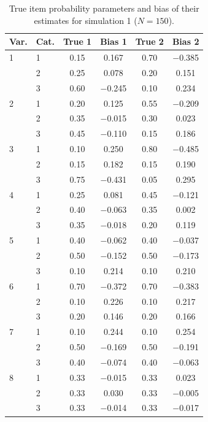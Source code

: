 \begin{table}[H]
\centering
\begin{tabular}{llcccc}
  \toprule
\textbf{Var.} & \textbf{Cat.} & \textbf{True 1} & \textbf{Bias 1} & \textbf{True 2} & \textbf{Bias 2} \\ 
  \midrule
1 & 1 & 0.15 & 0.167 & 0.70 & $-$0.385 \\ 
   & 2 & 0.25 & 0.078 & 0.20 & 0.151 \\ 
   & 3 & 0.60 & $-$0.245 & 0.10 & 0.234 \\ 
  2 & 1 & 0.20 & 0.125 & 0.55 & $-$0.209 \\ 
   & 2 & 0.35 & $-$0.015 & 0.30 & 0.023 \\ 
   & 3 & 0.45 & $-$0.110 & 0.15 & 0.186 \\ 
  3 & 1 & 0.10 & 0.250 & 0.80 & $-$0.485 \\ 
   & 2 & 0.15 & 0.182 & 0.15 & 0.190 \\ 
   & 3 & 0.75 & $-$0.431 & 0.05 & 0.295 \\ 
  4 & 1 & 0.25 & 0.081 & 0.45 & $-$0.121 \\ 
   & 2 & 0.40 & $-$0.063 & 0.35 & 0.002 \\ 
   & 3 & 0.35 & $-$0.018 & 0.20 & 0.119 \\ 
  5 & 1 & 0.40 & $-$0.062 & 0.40 & $-$0.037 \\ 
   & 2 & 0.50 & $-$0.152 & 0.50 & $-$0.173 \\ 
   & 3 & 0.10 & 0.214 & 0.10 & 0.210 \\ 
  6 & 1 & 0.70 & $-$0.372 & 0.70 & $-$0.383 \\ 
   & 2 & 0.10 & 0.226 & 0.10 & 0.217 \\ 
   & 3 & 0.20 & 0.146 & 0.20 & 0.166 \\ 
  7 & 1 & 0.10 & 0.244 & 0.10 & 0.254 \\ 
   & 2 & 0.50 & $-$0.169 & 0.50 & $-$0.191 \\ 
   & 3 & 0.40 & $-$0.074 & 0.40 & $-$0.063 \\ 
  8 & 1 & 0.33 & $-$0.015 & 0.33 & 0.023 \\ 
   & 2 & 0.33 & 0.030 & 0.33 & $-$0.005 \\ 
   & 3 & 0.33 & $-$0.014 & 0.33 & $-$0.017 \\ 
   \bottomrule
\end{tabular}
\caption{True item probability parameters and bias of their estimates for simulation 1 ($N = 150$).} 
\label{table:sim1_item_prob_bias_N150}
\end{table}
